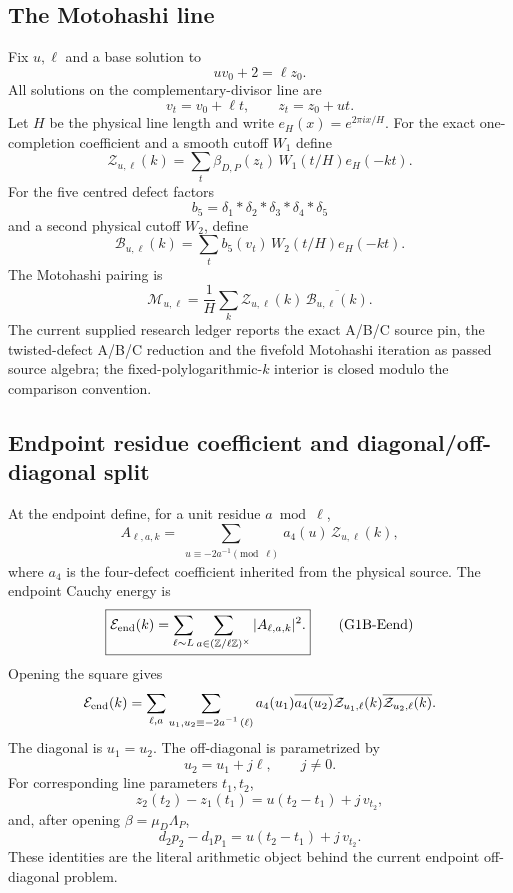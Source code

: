 \documentclass[11pt]{article}
\theoremstyle{definition}
\newcommand{\1}{\mathbf 1}
\begin{document}
\subsection{The Motohashi line}

Fix $u,\ell$ and a base solution to
\[
\boxed{uv_0+2=\ell z_0.}
\tag{G1B-base}
\]
All solutions on the complementary-divisor line are
\[
\boxed{
v_t=v_0+\ell t,\qquad
z_t=z_0+ut.
}
\tag{G1B-line}
\]
Let $H$ be the physical line length and write $e_H(x)=e^{2\pi ix/H}$.
For the exact one-completion coefficient and a smooth cutoff $W_1$ define
\[
\boxed{
\mathcal Z_{u,\ell}(k)
=
\sum_t
\beta_{D,P}(z_t)\,
W_1(t/H)e_H(-kt).
}
\tag{G1B-Z}
\]
For the five centred defect factors
\[
b_5=\delta_1*\delta_2*\delta_3*\delta_4*\delta_5
\]
and a second physical cutoff $W_2$, define
\[
\boxed{
\mathcal B_{u,\ell}(k)
=
\sum_t
b_5(v_t)\,
W_2(t/H)e_H(-kt).
}
\tag{G1B-B}
\]
The Motohashi pairing is
\[
\boxed{
\mathcal M_{u,\ell}
=
\frac1H
\sum_k
\mathcal Z_{u,\ell}(k)\,
\overline{\mathcal B_{u,\ell}(k)}.
}
\tag{G1B-M}
\]
The current supplied research ledger reports the exact A/B/C source pin, the twisted-defect
A/B/C reduction and the fivefold Motohashi iteration as passed source algebra; the
fixed-polylogarithmic-$k$ interior is closed modulo the comparison convention.

\subsection{Endpoint residue coefficient and diagonal/off-diagonal split}

At the endpoint define, for a unit residue $a\bmod\ell$,
\[
\boxed{
A_{\ell,a,k}
=
\sum_{\substack{u\equiv-2a^{-1}\pmod\ell}}
a_4(u)\,\mathcal Z_{u,\ell}(k),
}
\tag{G1B-A}
\]
where $a_4$ is the four-defect coefficient inherited from the physical source.
The endpoint Cauchy energy is
\[
\boxed{
\mathcal E_{\rm end}(k)
=
\sum_{\ell\sim L}
\sum_{a\in(\mathbb Z/\ell\mathbb Z)^\times}
|A_{\ell,a,k}|^2.
}
\tag{G1B-Eend}
\]
Opening the square gives
\[
\mathcal E_{\rm end}(k)
=
\sum_{\ell,a}
\sum_{\substack{u_1,u_2\equiv-2a^{-1}\,(\ell)}}
a_4(u_1)\overline{a_4(u_2)}
\mathcal Z_{u_1,\ell}(k)
\overline{\mathcal Z_{u_2,\ell}(k)}.
\]
The diagonal is $u_1=u_2$.  The off-diagonal is parametrized by
\[
\boxed{u_2=u_1+j\ell,\qquad j\ne0.}
\tag{G1B-j}
\]
For corresponding line parameters $t_1,t_2$,
\[
\boxed{
z_2(t_2)-z_1(t_1)
=
u(t_2-t_1)+j\,v_{t_2},
}
\tag{G1B-off-source}
\]
and, after opening $\beta=\mu_D\Lambda_P$,
\[
\boxed{
d_2p_2-d_1p_1
=
u(t_2-t_1)+j\,v_{t_2}.
}
\tag{G1B-off-beta}
\]
These identities are the literal arithmetic object behind the current endpoint
off-diagonal problem.
\end{document}

